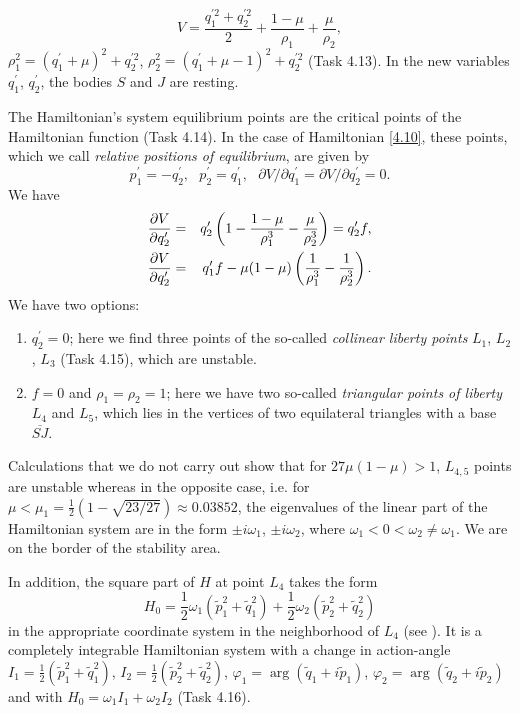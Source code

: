 \begin{example}
	$$
	V =\frac{q_{1}^{\prime 2}+q_{2}^{\prime 2}}{2}+\frac{1-\mu }{\rho _{1}}+%
	\frac{\mu }{\rho _{2}},
	$$
	$\rho _{1}^{2}=\left( q_{1}^{\prime }+\mu \right) ^{2}+q_{2}^{\prime 2}$, $\rho _{2}^{2}=\left( q_{1}^{\prime }+\mu -1\right) ^{2}+q_{2}^{\prime 2}$ (Task 4.13). In the new variables $q_{1}^{\prime }$, $q_{2}^{\prime }$, the bodies $S$ and $J$ are resting.
	
	The Hamiltonian's system equilibrium points are the critical points of the Hamiltonian function (Task 4.14). In the case of Hamiltonian \eqref{4.10}, these points, which we call \emph{relative positions of equilibrium}, are given by 
	$$
	p_{1}^{\prime }=-q_{2}^{\prime },\text{ \ \ }p_{2}^{\prime }=q_{1}^{\prime },%
	\text{ \ \ }\partial V/\partial q_{1}^{\prime }=\partial V/\partial
	q_{2}^{\prime }=0.
	$$
	We have
	\begin{eqnarray*}
		\frac{\partial V}{\partial q_{2}^{\prime }} &=&q_{2}^{\prime }\left( 1-\frac{%
			1-\mu }{\rho _{1}^{3}}-\frac{\mu }{\rho _{2}^{3}}\right) =q_{2}^{\prime }f,
		\\
		\frac{\partial V}{\partial q_{2}^{\prime }} &=&q_{1}^{\prime }f-\mu (1-\mu
		)\left( \frac{1}{\rho _{1}^{3}}-\frac{1}{\rho _{2}^{3}}\right) .
	\end{eqnarray*}
	We have two options:
	\begin{enumerate}
		\item $q_{2}^{\prime }=0$; here we find three points of the so-called \emph{collinear liberty points} $L_{1}$, $L_{2}$, $L_{3}$	(Task 4.15), which are unstable.
		\item $f=0$ and $\rho _{1}=\rho _{2}=1$; here we have two so-called \emph{triangular points of liberty} $L_4$ and $L_5$, which lies in the vertices of two equilateral triangles with a base $\overline{SJ}.$
	\end{enumerate}

	Calculations that we do not carry out show that for $27\mu
	(1-\mu )>1$, $L_{4,5}$ points are unstable whereas in the opposite case, i.e. for $\mu <\mu _{1}=\frac{1}{2}(1-\sqrt{23/27})\approx 0.03852$, the eigenvalues of the linear part of the Hamiltonian system are in the form $\pm i\omega _{1}$, $\pm i\omega _{2}$, where $\omega _{1}<0<\omega _{2}\not=\omega _{1}$. We are on the border of the stability area.
	
	In addition, the square part of $H$ at point $L_{4}$ takes the form
	$$
	H_{0}=\frac{1}{2}\omega _{1}(\tilde{p}_{1}^{2}+\tilde{q}_{1}^{2})+\frac{1}{2}%
	\omega _{2}\left( \tilde{p}_{2}^{2}+\tilde{q}_{2}^{2}\right)
	$$
	in the appropriate coordinate system in the neighborhood of $L_{4}$ (see \cite{Zol1}). It is a completely integrable Hamiltonian system with a change in action-angle $I_{1}=\frac{1}{2}(\tilde{p}_{1}^{2}+\tilde{q}%
	_{1}^{2})$, $I_{2}=\frac{1}{2}\left( \tilde{p}_{2}^{2}+\tilde{q}%
	_{2}^{2}\right) $, $\varphi _{1}=\arg \left( \tilde{q}_{1}+i\tilde{p}%
	_{1}\right) $, $\varphi _{2}=\arg \left( \tilde{q}_{2}+i\tilde{p}%
	_{2}\right) $ and with $H_{0}=\omega _{1}I_{1}+\omega _{2}I_{2}$ (Task 4.16).
	

\end{example}

